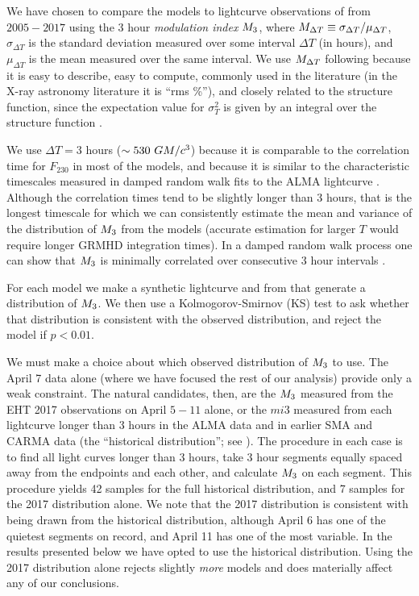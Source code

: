 We have chosen to compare the models to lightcurve observations of \sgra from $2005-2017$ using the 3 hour {\em modulation index} $M_{3}$, where $M_{\Delta T} \equiv \sigma_{\Delta T}/\mu_{\Delta T}$, $\sigma_{\Delta T}$ is the standard deviation measured over some interval $\Delta T$ (in hours), and $\mu_{\Delta T}$ is the mean measured over the same interval.  We use $M_{\Delta T}$ following \citet{2015ApJ...812..103C} because it is easy to describe, easy to compute, commonly used in the literature (in the X-ray astronomy literature it is ``rms \%''), and closely related to the structure function, since the expectation value for $\sigma_T^2$ is given by an integral over the structure function \citep[see][]{Lee_2022}.

We use $\Delta T = 3$ hours ($\sim 530~GM/c^3$) because it is comparable to the correlation time for $F_{230}$ in most of the models, and because it is similar to the characteristic timescales measured in damped random walk fits to the ALMA lightcurve \citep[see Table 10 of][]{Wielgus2022}.  Although the correlation times tend to be slightly longer than 3 hours, that is the longest timescale for which we can consistently estimate the mean and variance of the distribution of $M_{3}$ from the models (accurate estimation for larger $T$ would require longer GRMHD integration times).  In a damped random walk process one can show that $M_{3}$ is minimally correlated over consecutive 3 hour intervals \citep{Lee_2022}.

For each model we make a synthetic lightcurve and from that generate a distribution of $M_{3}$.  We then use a Kolmogorov-Smirnov (KS) test to ask whether that distribution is consistent with the observed distribution, and reject the model if $p < 0.01$.

We must make a choice about which observed distribution of $M_{3}$ to use.  The April 7 data alone (where we have focused the rest of our analysis) provide only a weak constraint.  The natural candidates, then, are the $M_{3}$ measured from the EHT 2017 observations on April $5-11$ alone, or the $mi{3}$ measured from each lightcurve longer than 3 hours in the ALMA data and in earlier SMA and CARMA data (the ``historical distribution''; see \citealt{Wielgus2022}).  The procedure in each case is to find all light curves longer than 3 hours, take 3 hour segments equally spaced away from the endpoints and each other, and calculate $M_{3}$ on each segment.  This procedure yields 42 samples for the full historical distribution, and 7 samples for the 2017 distribution alone.  We note that the 2017 distribution is consistent with being drawn from the historical distribution, although April 6 has one of the quietest segments on record, and April 11 has one of the most variable.  In the results presented below we have opted to use the historical distribution.  Using the 2017 distribution alone rejects slightly {\em more} models and does materially affect any of our conclusions.

